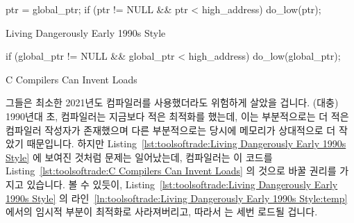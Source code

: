 \begin{listing}[tbp]
\begin{fcvlabel}
\begin{VerbatimL}[commandchars=\\\{\}]
ptr = global_ptr;
if (ptr != NULL && ptr < high_address)
	do_low(ptr);
\end{VerbatimL}
\end{fcvlabel}
\caption{Living Dangerously Early 1990s Style}
\label{lst:toolsoftrade:Living Dangerously Early 1990s Style}
\end{listing}

\begin{listing}[tbp]
\begin{fcvlabel}
\begin{VerbatimL}[commandchars=\\\{\}]
if (global_ptr != NULL &&
    global_ptr < high_address)
	do_low(global_ptr);
\end{VerbatimL}
\end{fcvlabel}
\caption{C Compilers Can Invent Loads}
\label{lst:toolsoftrade:C Compilers Can Invent Loads}
\end{listing}

그들은 최소한 2021년도 컴파일러를 사용했더라도 위험하게 살았을 겁니다.
(대충) 1990년대 초, 컴파일러는 지금보다 적은 최적화를 했는데, 이는 부분적으로는
더 적은 컴파일러 작성자가 존재했으며 다른 부분적으로는 당시에 메모리가
상대적으로 더 작았기 때문입니다.
하지만
Listing~\ref{lst:toolsoftrade:Living Dangerously Early 1990s Style}
에 보여진 것처럼 문제는 일어났는데, 컴파일러는 이 코드를
Listing~\ref{lst:toolsoftrade:C Compilers Can Invent Loads}
의 것으로 바꿀 권리를 가지고 있습니다.
볼 수 있듯이,
Listing~\ref{lst:toolsoftrade:Living Dangerously Early 1990s Style} 의
라인~\ref{ln:toolsoftrade:Living Dangerously Early 1990s Style:temp}
에서의 임시적 부분이 최적화로 사라져버리고, 따라서  는 세번
로드될 겁니다.

